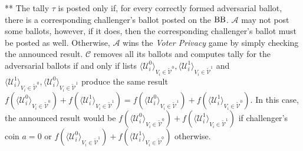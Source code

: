 ** The tally $\tau$ is posted only if, for every correctly formed adversarial ballot, there is a corresponding challenger's ballot posted on the $\operatorname{BB}$. $\mathcal{A}$ may not post some ballots, however, if it does, then the corresponding challenger's ballot must be posted as well. Otherwise, $\mathcal{A}$ wins the \textit{Voter Privacy} game by simply checking the announced result.  $\mathcal{C}$ removes all its ballots and computes tally for the adversarial ballots if and only if  lists $\langle \mathcal{U}^0_i \rangle _{V_i \in \tilde{\mathcal{V}}^0}, \langle \mathcal{U}^1_i \rangle _{V_i \in \tilde{\mathcal{V}}^1}$ and $\langle \mathcal{U}^1_i \rangle _{V_i \in \tilde{\mathcal{V}}^0}, \langle \mathcal{U}^0_i \rangle _{V_i \in \tilde{\mathcal{V}}^1}$ produce the same result $f(\langle \mathcal{U}^0_i \rangle _{V_i \in \tilde{\mathcal{V}}^0} ) + f(\langle \mathcal{U}^1_i \rangle _{V_i \in \tilde{\mathcal{V}}^1} ) =  f(\langle \mathcal{U}^0_i \rangle _{V_i \in \tilde{\mathcal{V}}^1} ) +  f(\langle \mathcal{U}^1_i \rangle _{V_i \in \tilde{\mathcal{V}}^0} )$. In this case, the announced result would be $f(\langle \mathcal{U}^0_i \rangle _{V_i \in \tilde{\mathcal{V}}^0} ) + f(\langle \mathcal{U}^1_i \rangle _{V_i \in \tilde{\mathcal{V}}^1} )$ if challenger's coin $a=0$ or  $f(\langle \mathcal{U}^0_i \rangle _{V_i \in \tilde{\mathcal{V}}^1} ) +  f(\langle \mathcal{U}^1_i \rangle _{V_i \in \tilde{\mathcal{V}}^0} )$ otherwise.\\



